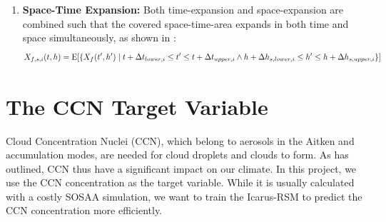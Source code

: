 \begin{enumerate}
    \item \textbf{Space-Time Expansion:} Both time-expansion and space-expansion are combined such that the covered space-time-area expands in both time and space simultaneously, as shown in :
    \begin{equation*}
        X_{f,s,i}(t, h) = \text{E}[\{ X_{f}(t', h') \mathrel{|} t + \Delta t_{lower, i} \leq t' \leq t + \Delta t_{upper, i} \wedge h + \Delta h_{s, lower, i} \leq h' \leq h + \Delta h_{s, upper, i} \}]
    \end{equation*}
\end{enumerate}


\section{The CCN Target Variable} \label{txt:ccn-target}

Cloud Concentration Nuclei (CCN), which belong to aerosols in the Aitken and accumulation modes, are needed for cloud droplets and clouds to form. As  has outlined, CCN thus have a significant impact on our climate. In this project, we use the CCN concentration as the target variable. While it is usually calculated with a costly SOSAA simulation, we want to train the Icarus-RSM to predict the CCN concentration more efficiently.

